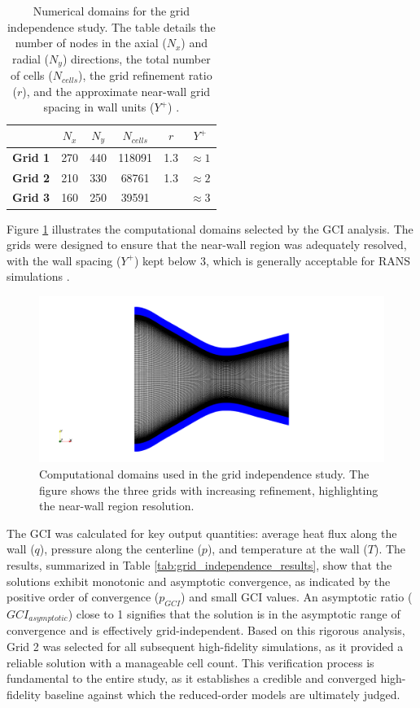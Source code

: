 \documentclass[tg, EN]{ufabcFHZh_tg}
\begin{document}
\begin{table}[H]
\centering
\caption{Numerical domains for the grid independence study. The table details the number of nodes in the axial ($N_x$) and radial ($N_y$) directions, the total number of cells ($N_{cells}$), the grid refinement ratio ($r$), and the approximate near-wall grid spacing in wall units ($Y^{+}$) \citep{moreira2023}.}
\label{tab:grid_independence_domains}
\begin{tabular}{lccccc}
\toprule
 & $N_x$ & $N_y$ & $N_{cells}$ & $r$ & $Y^{+}$ \\
\midrule
\textbf{Grid 1} & 270 & 440 & 118091 & 1.3 & $\approx1$ \\
\textbf{Grid 2} & 210 & 330 & 68761 & 1.3 & $\approx2$ \\
\textbf{Grid 3} & 160 & 250 & 39591 & & $\approx3$ \\
\bottomrule
\end{tabular}
\end{table}

Figure \ref{fig:grid_choosen} illustrates the computational domains selected by the GCI analysis. The grids were designed to ensure that the near-wall region was adequately resolved, with the wall spacing ($Y^{+}$) kept below 3, which is generally acceptable for RANS simulations \citep{moreira2023}.

\begin{figure}[H]
    \centering
    \includegraphics[width=\textwidth]{Figuras/grid_choosen.png}
    \caption{Computational domains used in the grid independence study. The figure shows the three grids with increasing refinement, highlighting the near-wall region resolution.}
    \label{fig:grid_choosen}
\end{figure}

The GCI was calculated for key output quantities: average heat flux along the wall ($q$), pressure along the centerline ($p$), and temperature at the wall ($T$). The results, summarized in Table \ref{tab:grid_independence_results}, show that the solutions exhibit monotonic and asymptotic convergence, as indicated by the positive order of convergence ($p_{GCI}$) and small GCI values. An asymptotic ratio ($GCI_{asymptotic}$) close to 1 signifies that the solution is in the asymptotic range of convergence and is effectively grid-independent. Based on this rigorous analysis, Grid 2 was selected for all subsequent high-fidelity simulations, as it provided a reliable solution with a manageable cell count. This verification process is fundamental to the entire study, as it establishes a credible and converged high-fidelity baseline against which the reduced-order models are ultimately judged.
\end{document}
